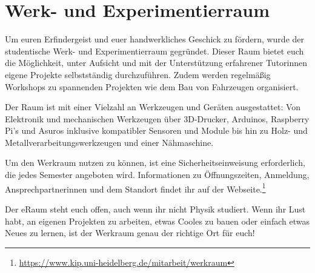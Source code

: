 
\section{Werk- und Experimentierraum}
\label{werk-und-experimentierraum}

Um euren Erfindergeist und euer handwerkliches Geschick zu fördern, wurde der studentische Werk- und Experimentierraum gegründet. Dieser Raum bietet euch die Möglichkeit, unter Aufsicht und mit der Unterstützung erfahrener Tutorinnen eigene Projekte selbstständig durchzuführen. Zudem werden regelmäßig Workshops zu spannenden Projekten wie dem Bau von Fahrzeugen organisiert.

Der Raum ist mit einer Vielzahl an Werkzeugen und Geräten ausgestattet: Von Elektronik und mechanischen Werkzeugen über 3D-Drucker, Arduinos, Raspberry Pi's und Asuros inklusive kompatibler Sensoren und Module bis hin zu Holz- und Metallverarbeitungswerkzeugen und einer Nähmaschine.

Um den Werkraum nutzen zu können, ist eine Sicherheitseinweisung erforderlich, die jedes Semester angeboten wird. Informationen zu Öffnungszeiten, Anmeldung, Ansprechpartnerinnen und dem Standort findet ihr auf der Webseite.\footnote{\url{https://www.kip.uni-heidelberg.de/mitarbeit/werkraum}}%

Der eRaum steht euch offen, auch wenn ihr nicht Physik studiert. Wenn ihr Lust habt, an eigenen Projekten zu arbeiten, etwas Cooles zu bauen oder einfach etwas Neues zu lernen, ist der Werkraum genau der richtige Ort für euch!
